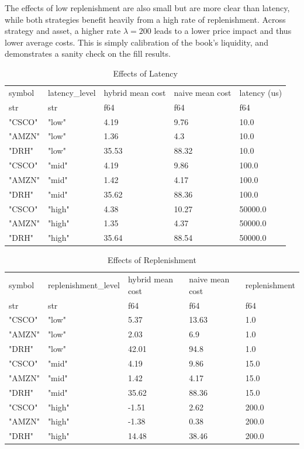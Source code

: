 \documentclass[
  letterpaper,
]{article}
\begin{document}
The effects of low replenishment are also small but are more clear than
latency, while both strategies benefit heavily from a high rate of
replenishment. Across strategy and asset, a higher rate \(\lambda=200\)
leads to a lower price impact and thus lower average costs. This is
simply calibration of the book's liquidity, and demonstrates a sanity
check on the fill results.

\begin{longtable}[]{@{}lllll@{}}

\caption{\label{tbl-latency}Effects of Latency}

\tabularnewline

\toprule\noalign{}
symbol & latency\_level & hybrid mean cost & naive mean cost & latency
(us) \\
str & str & f64 & f64 & f64 \\
\midrule\noalign{}
\endhead
\bottomrule\noalign{}
\endlastfoot
"CSCO" & "low" & 4.19 & 9.76 & 10.0 \\
"AMZN" & "low" & 1.36 & 4.3 & 10.0 \\
"DRH" & "low" & 35.53 & 88.32 & 10.0 \\
"CSCO" & "mid" & 4.19 & 9.86 & 100.0 \\
"AMZN" & "mid" & 1.42 & 4.17 & 100.0 \\
"DRH" & "mid" & 35.62 & 88.36 & 100.0 \\
"CSCO" & "high" & 4.38 & 10.27 & 50000.0 \\
"AMZN" & "high" & 1.35 & 4.37 & 50000.0 \\
"DRH" & "high" & 35.64 & 88.54 & 50000.0 \\

\end{longtable}

\begin{longtable}[]{@{}lllll@{}}

\caption{\label{tbl-replenishment}Effects of Replenishment}

\tabularnewline

\toprule\noalign{}
symbol & replenishment\_level & hybrid mean cost & naive mean cost &
replenishment \\
str & str & f64 & f64 & f64 \\
\midrule\noalign{}
\endhead
\bottomrule\noalign{}
\endlastfoot
"CSCO" & "low" & 5.37 & 13.63 & 1.0 \\
"AMZN" & "low" & 2.03 & 6.9 & 1.0 \\
"DRH" & "low" & 42.01 & 94.8 & 1.0 \\
"CSCO" & "mid" & 4.19 & 9.86 & 15.0 \\
"AMZN" & "mid" & 1.42 & 4.17 & 15.0 \\
"DRH" & "mid" & 35.62 & 88.36 & 15.0 \\
"CSCO" & "high" & -1.51 & 2.62 & 200.0 \\
"AMZN" & "high" & -1.38 & 0.38 & 200.0 \\
"DRH" & "high" & 14.48 & 38.46 & 200.0 \\

\end{longtable}
\end{document}
